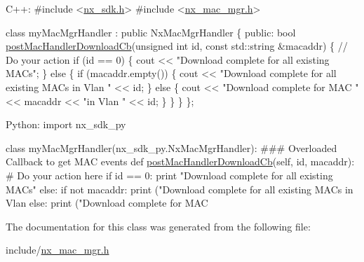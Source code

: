 \begin{DoxyCode}
C++:
\textcolor{preprocessor}{   #include <\mbox{\hyperlink{nx__sdk_8h}{nx\_sdk.h}}>}
\textcolor{preprocessor}{   #include <\mbox{\hyperlink{nx__mac__mgr_8h}{nx\_mac\_mgr.h}}>}

   \textcolor{keyword}{class }myMacMgrHandler : \textcolor{keyword}{public} NxMacMgrHandler \{
      \textcolor{keyword}{public}:
         \textcolor{keywordtype}{bool} \mbox{\hyperlink{classnxos_1_1_nx_mac_mgr_handler_a42d84c9f4da1211024912efd4416827e}{postMacHandlerDownloadCb}}(\textcolor{keywordtype}{unsigned} \textcolor{keywordtype}{int} \textcolor{keywordtype}{id}, 
                                       \textcolor{keyword}{const} std::string &macaddr) \{
              \textcolor{comment}{// Do your action}
              \textcolor{keywordflow}{if} (\textcolor{keywordtype}{id} == 0) \{
                  cout << \textcolor{stringliteral}{"Download complete for all existing MACs"};
              \} \textcolor{keywordflow}{else} \{
                  \textcolor{keywordflow}{if} (macaddr.empty()) \{
                      cout << \textcolor{stringliteral}{"Download complete for all existing MACs in Vlan "} << id;
                  \} \textcolor{keywordflow}{else} \{
                       cout << \textcolor{stringliteral}{"Download complete for MAC "} << macaddr << \textcolor{stringliteral}{"in Vlan "} << id;
                  \}
              \}
         \}
   \};

Python:
   \textcolor{keyword}{import} nx\_sdk\_py

   \textcolor{keyword}{class }myMacMgrHandler(nx\_sdk\_py.NxMacMgrHandler):
\textcolor{preprocessor}{   ### Overloaded Callback to get MAC events}
         def \mbox{\hyperlink{classnxos_1_1_nx_mac_mgr_handler_a42d84c9f4da1211024912efd4416827e}{postMacHandlerDownloadCb}}(self, id, macaddr):
\textcolor{preprocessor}{             # Do your action here}
             if id == 0:
                print "Download complete for all existing MACs"
             else:
                if not macaddr:
                   print ("Download complete for all existing MACs in Vlan %
                else:
                   print ("Download complete for MAC %
\end{DoxyCode}
 

The documentation for this class was generated from the following file\+:\begin{DoxyCompactItemize}
\item 
include/\mbox{\hyperlink{nx__mac__mgr_8h}{nx\+\_\+mac\+\_\+mgr.\+h}}\end{DoxyCompactItemize}
